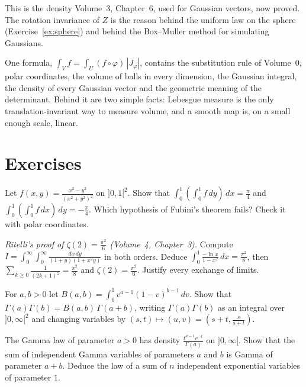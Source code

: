 This is the density Volume~3, Chapter~6, used for Gaussian vectors, now proved. The rotation invariance of $Z$ is the reason behind the uniform law on the sphere (Exercise~\ref{ex:sphere}) and behind
the Box--Muller method for simulating Gaussians.

\begin{beauty}
One formula, $\int_Vf=\int_U(f\circ\varphi)\,|J_\varphi|$, contains the substitution rule of Volume~0, polar coordinates, the volume of balls in every dimension, the Gaussian integral, the density of every
Gaussian vector and the geometric meaning of the determinant. Behind it are two simple facts: Lebesgue measure is the only translation-invariant way to measure volume, and a smooth map is, on a
small enough scale, linear.
\end{beauty}

\section{Exercises}

\begin{exercise}[$\star$]\label{ex:fubinifail}
Let $f(x,y)=\frac{x^2-y^2}{(x^2+y^2)^2}$ on $]0,1[^2$. Show that $\int_0^1(\int_0^1f\,dy)\,dx=\frac\pi4$ and $\int_0^1(\int_0^1f\,dx)\,dy=-\frac\pi4$. Which hypothesis of Fubini's theorem fails? Check it with polar
coordinates.
\end{exercise}

\begin{exercise}[$\star\star$]\label{ex:basel}
\emph{Ritelli's proof of $\zeta(2)=\frac{\pi^2}6$ (Volume~4, Chapter~3).} Compute $I=\int_0^\infty\!\int_0^\infty\frac{dx\,dy}{(1+y)(1+x^2y)}$ in both orders. Deduce $\int_0^1\frac{-\ln x}{1-x^2}\,dx=\frac{\pi^2}8$, then
$\sum_{k\ge0}\frac1{(2k+1)^2}=\frac{\pi^2}8$ and $\zeta(2)=\frac{\pi^2}6$. Justify every exchange of limits.
\end{exercise}

\begin{exercise}[$\star\star$]\label{ex:betagamma}
For $a,b>0$ let $B(a,b)=\int_0^1v^{a-1}(1-v)^{b-1}\,dv$. Show that $\Gamma(a)\Gamma(b)=B(a,b)\,\Gamma(a+b)$, writing $\Gamma(a)\Gamma(b)$ as an integral over $]0,\infty[^2$ and changing variables by
$(s,t)\mapsto(u,v)=(s+t,\frac s{s+t})$.
\end{exercise}

\begin{exercise}[$\star$]\label{ex:gammasum}
The Gamma law of parameter $a>0$ has density $\frac{t^{a-1}e^{-t}}{\Gamma(a)}$ on $]0,\infty[$. Show that the sum of independent Gamma variables of parameters $a$ and $b$ is Gamma of parameter $a+b$. Deduce
the law of a sum of $n$ independent exponential variables of parameter $1$.
\end{exercise}

